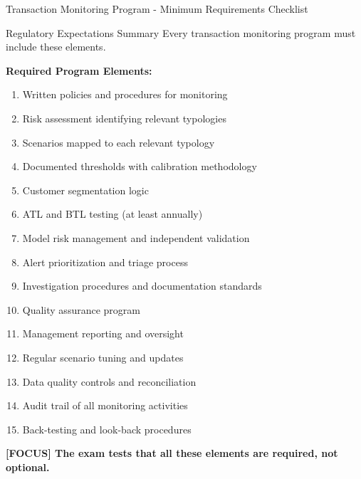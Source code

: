 \documentclass[11pt,a4paper]{beamer}
\newcommand{\examfocus}[1]{\textcolor{orange!80!black}{\textbf{[FOCUS] #1}}}
\begin{document}
	\begin{frame}{Transaction Monitoring Program - Minimum Requirements Checklist}
	\begin{block}{Regulatory Expectations Summary}
		Every transaction monitoring program must include these elements.
	\end{block}
	
	\textbf{Required Program Elements:}
	\begin{enumerate}
		\item Written policies and procedures for monitoring
		\item Risk assessment identifying relevant typologies
		\item Scenarios mapped to each relevant typology
		\item Documented thresholds with calibration methodology
		\item Customer segmentation logic
		\item ATL and BTL testing (at least annually)
		\item Model risk management and independent validation
		\item Alert prioritization and triage process
		\item Investigation procedures and documentation standards
		\item Quality assurance program
		\item Management reporting and oversight
		\item Regular scenario tuning and updates
		\item Data quality controls and reconciliation
		\item Audit trail of all monitoring activities
		\item Back-testing and look-back procedures
	\end{enumerate}
	
	\examfocus{The exam tests that all these elements are required, not optional.}
	\end{frame}
	
\end{document}
